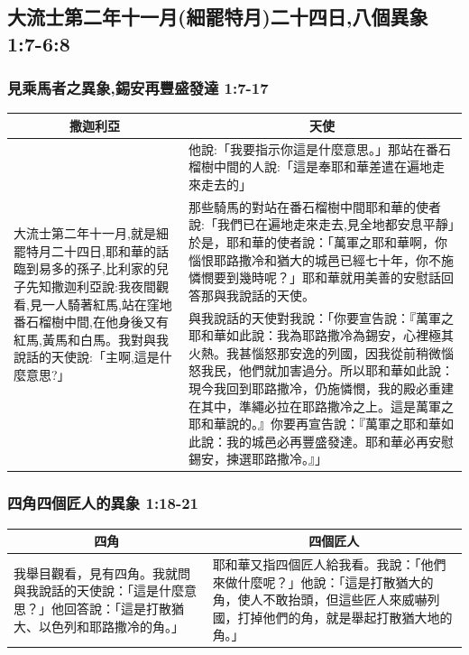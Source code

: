 \subsection{大流士第二年十一月(細罷特月)二十四日,八個異象 1:7-6:8}
\subsubsection{見乘馬者之異象,錫安再豐盛發達 1:7-17}



\begin{table}[H]
\centering 
\begin{tabular}{p{3.7cm}|p{13.6cm}}\hline\hline
\multicolumn{1}{c|}{撒迦利亞}&\multicolumn{1}{c}{天使}\\\hline
\multirow{3}{3.9cm}{大流士第二年十一月,就是細罷特月二十四日,耶和華的話臨到易多的孫子,比利家的兒子先知撒迦利亞說:我夜間觀看,見一人騎著紅馬,站在窪地番石榴樹中間,在他身後又有紅馬,黃馬和白馬。我對與我說話的天使說:「主啊,這是什麼意思?」}
&他說:「我要指示你這是什麼意思。」那站在番石榴樹中間的人說:「這是奉耶和華差遣在遍地走來走去的」\\\cline{2-2}
&那些騎馬的對站在番石榴樹中間耶和華的使者說:「我們已在遍地走來走去,見全地都安息平靜」於是，耶和華的使者說：「萬軍之耶和華啊，你惱恨耶路撒冷和猶大的城邑已經七十年，你不施憐憫要到幾時呢？」耶和華就用美善的安慰話回答那與我說話的天使。\\\cline{2-2}
&與我說話的天使對我說：「你要宣告說：『萬軍之耶和華如此說：我為耶路撒冷為錫安，心裡極其火熱。我甚惱怒那安逸的列國，因我從前稍微惱怒我民，他們就加害過分。所以耶和華如此說：現今我回到耶路撒冷，仍施憐憫，我的殿必重建在其中，準繩必拉在耶路撒冷之上。這是萬軍之耶和華說的。』你要再宣告說：『萬軍之耶和華如此說：我的城邑必再豐盛發達。耶和華必再安慰錫安，揀選耶路撒冷。』」\\\hline
\end{tabular}
\end{table}

\subsubsection{四角四個匠人的異象 1:18-21}
\begin{table}[H]
\centering 
\begin{tabular}{p{}|p{8.75cm}}\hline\hline
\multicolumn{1}{c|}{四角}&\multicolumn{1}{c}{四個匠人}\\\hline
我舉目觀看，見有四角。我就問與我說話的天使說：「這是什麼意思？」他回答說：「這是打散猶大、以色列和耶路撒冷的角。」
&耶和華又指四個匠人給我看。我說：「他們來做什麼呢？」他說：「這是打散猶大的角，使人不敢抬頭，但這些匠人來威嚇列國，打掉他們的角，就是舉起打散猶大地的角。」\\\hline
\end{tabular}
\end{table}


